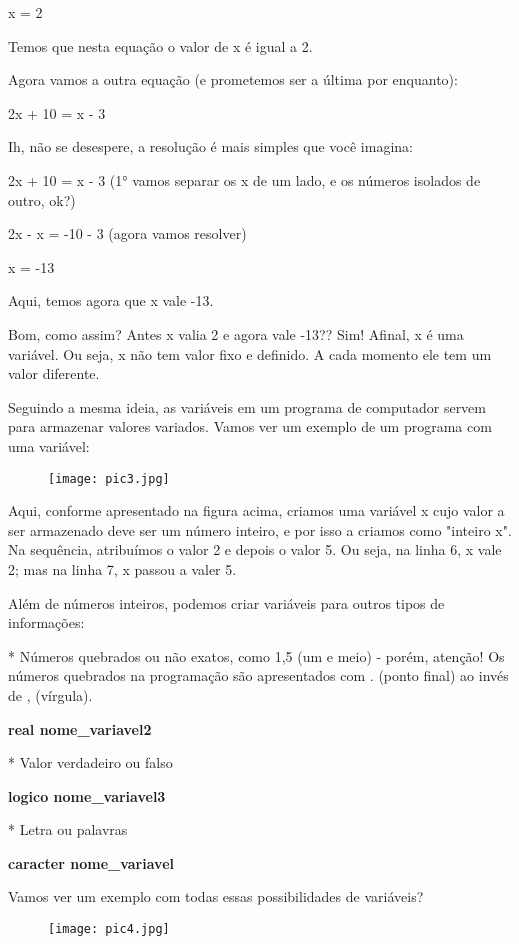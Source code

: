 \documentclass{article}
\begin{document}
x = 2

Temos que nesta equação o valor de x é igual a 2.

Agora vamos a outra equação (e prometemos ser a última por enquanto):

2x + 10 = x - 3

Ih, não se desespere, a resolução é mais simples que você imagina:

2x + 10 = x - 3 (1° vamos separar os x de um lado, e os números isolados de outro, ok?)

2x - x = -10 - 3 (agora vamos resolver)

x = -13

Aqui, temos agora que x vale -13.

Bom, como assim? Antes x valia 2 e agora vale -13?? Sim! Afinal, x é uma variável. Ou seja, x não tem valor fixo e definido. A cada momento ele tem um valor diferente.

Seguindo a mesma ideia, as variáveis em um programa de computador servem para armazenar valores variados. Vamos ver um exemplo de um programa com uma variável:

\begin{figure}[H]
    \centering
    \texttt{[image: pic3.jpg]}
    \label{fig:pic3}
\end{figure}

Aqui, conforme apresentado na figura acima,  criamos uma variável x cujo valor a ser armazenado deve ser um número inteiro, e por isso a criamos como "inteiro x". Na sequência, atribuímos o valor 2 e depois o valor 5. Ou seja, na linha 6, x vale 2; mas na linha 7, x passou a valer 5.

Além de números inteiros, podemos criar variáveis para outros tipos de informações:

* Números quebrados ou não exatos, como 1,5 (um e meio) - porém, atenção! Os números quebrados na programação são apresentados com . (ponto final) ao invés de , (vírgula).

\textbf{real nome\_variavel2}

* Valor verdadeiro ou falso

\textbf{logico nome\_variavel3}

* Letra ou palavras

\textbf{caracter nome\_variavel}

Vamos ver um exemplo com todas essas possibilidades de variáveis?

\begin{figure}[H]
    \centering
    \texttt{[image: pic4.jpg]}
    \label{fig:pic4}
\end{figure}
\end{document}
